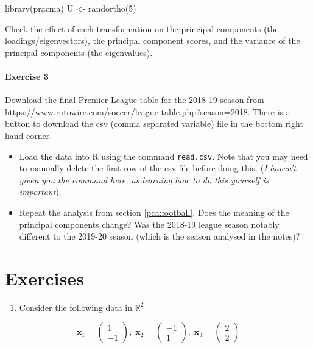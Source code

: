 \documentclass[
]{book}
\newenvironment{Shaded}{\begin{snugshade}}{\end{snugshade}}
\newcommand{\DecValTok}[1]{\textcolor[rgb]{0.00,0.00,0.81}{#1}}
\newcommand{\FunctionTok}[1]{\textcolor[rgb]{0.00,0.00,0.00}{#1}}
\newcommand{\NormalTok}[1]{#1}
\newcommand{\OtherTok}[1]{\textcolor[rgb]{0.56,0.35,0.01}{#1}}
\providecommand{\tightlist}{%
  \setlength{\itemsep}{0pt}\setlength{\parskip}{0pt}}
\theoremstyle{definition}
\theoremstyle{definition}
\theoremstyle{definition}
\theoremstyle{definition}
\theoremstyle{remark}
\begin{document}
\begin{Shaded}
\begin{Highlighting}[]
\FunctionTok{library}\NormalTok{(pracma)}
\NormalTok{U }\OtherTok{\textless{}{-}} \FunctionTok{randortho}\NormalTok{(}\DecValTok{5}\NormalTok{)}
\end{Highlighting}
\end{Shaded}

Check the effect of each transformation on the principal components (the loadings/eigenvectors), the principal component scores, and the variance of the principal components (the eigenvalues).

\hypertarget{exercise-3}{%
\paragraph*{Exercise 3}\label{exercise-3}}

Download the final Premier League table for the 2018-19 season from
\url{https://www.rotowire.com/soccer/league-table.php?season=2018}. There is a button to download the csv (comma separated variable) file in the bottom right hand corner.

\begin{itemize}
\item
  Load the data into R using the command \texttt{read.csv}. Note that you may need to manually delete the first row of the csv file before doing this. (\emph{I haven't given you the command here, as learning how to do this yourself is important}).
\item
  Repeat the analysis from section \ref{pca:football}. Does the meaning of the principal components change? Was the 2018-19 league season notably different to the 2019-20 season (which is the season analysed in the notes)?
\end{itemize}

\hypertarget{exercises-1}{%
\section{Exercises}\label{exercises-1}}

\begin{enumerate}
\def\labelenumi{\arabic{enumi}.}
\tightlist
\item
  Consider the following data in \(\mathbb{R}^2\)
\end{enumerate}

\[\mathbf x_1 =\begin{pmatrix}1\\-1\end{pmatrix},\; \mathbf x_2 =\begin{pmatrix}-1\\1\end{pmatrix},
\;\mathbf x_3 =\begin{pmatrix}2\\2\end{pmatrix}\]
\end{document}
